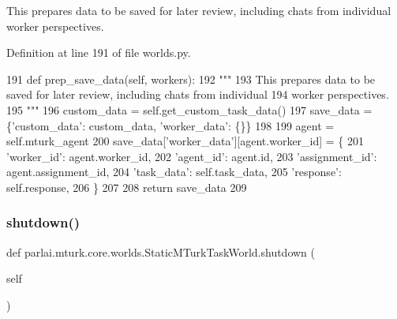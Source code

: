 \begin{DoxyVerb}This prepares data to be saved for later review, including chats from individual
worker perspectives.
\end{DoxyVerb}
 

Definition at line 191 of file worlds.\+py.


\begin{DoxyCode}
191     \textcolor{keyword}{def }prep\_save\_data(self, workers):
192         \textcolor{stringliteral}{"""}
193 \textcolor{stringliteral}{        This prepares data to be saved for later review, including chats from individual}
194 \textcolor{stringliteral}{        worker perspectives.}
195 \textcolor{stringliteral}{        """}
196         custom\_data = self.get\_custom\_task\_data()
197         save\_data = \{\textcolor{stringliteral}{'custom\_data'}: custom\_data, \textcolor{stringliteral}{'worker\_data'}: \{\}\}
198 
199         agent = self.mturk\_agent
200         save\_data[\textcolor{stringliteral}{'worker\_data'}][agent.worker\_id] = \{
201             \textcolor{stringliteral}{'worker\_id'}: agent.worker\_id,
202             \textcolor{stringliteral}{'agent\_id'}: agent.id,
203             \textcolor{stringliteral}{'assignment\_id'}: agent.assignment\_id,
204             \textcolor{stringliteral}{'task\_data'}: self.task\_data,
205             \textcolor{stringliteral}{'response'}: self.response,
206         \}
207 
208         \textcolor{keywordflow}{return} save\_data
209 
\end{DoxyCode}
\mbox{\label{classparlai_1_1mturk_1_1core_1_1worlds_1_1StaticMTurkTaskWorld_a793ecd56172f7bfd540b6d92887fb3f9}} 
\subsubsection{\texorpdfstring{shutdown()}{shutdown()}}
{\footnotesize\ttfamily def parlai.\+mturk.\+core.\+worlds.\+Static\+M\+Turk\+Task\+World.\+shutdown (\begin{DoxyParamCaption}\item[{}]{self }\end{DoxyParamCaption})}


